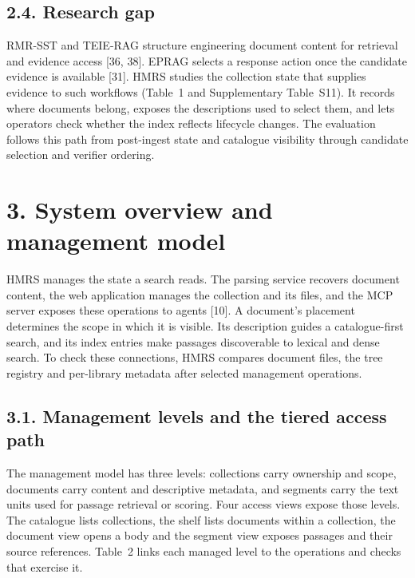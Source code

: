 \subsection{2.4. Research gap}


RMR-SST and TEIE-RAG structure engineering document content for retrieval
and evidence access [36, 38]. EPRAG
selects a response action once the candidate evidence is available
[31]. HMRS studies the collection state that
supplies evidence to such workflows (Table~1
and Supplementary Table~S11). It records where documents belong, exposes
the descriptions used to select them, and lets operators check whether
the index reflects lifecycle changes. The evaluation follows this path from
post-ingest state and catalogue visibility through candidate selection and
verifier ordering.


\section{3. System overview and management model}


HMRS manages the state a search reads. The parsing service recovers document
content, the web application manages the collection and its files, and the
MCP server exposes these operations to agents [10]. A document's
placement determines the scope in which it is visible. Its description
guides a catalogue-first search, and its index entries make passages
discoverable to lexical and dense search. To check these connections, HMRS
compares document files, the tree registry and per-library metadata after
selected management operations.

\subsection{3.1. Management levels and the tiered access path}


The management model has three levels: collections carry ownership and scope,
documents carry content and descriptive metadata, and segments carry the
text units used for passage retrieval or scoring. Four access views expose
those levels. The catalogue lists collections, the shelf lists documents
within a collection, the document view opens a body and the segment view
exposes passages and their source references. Table~2 links each
managed level to the operations and checks that exercise it.

